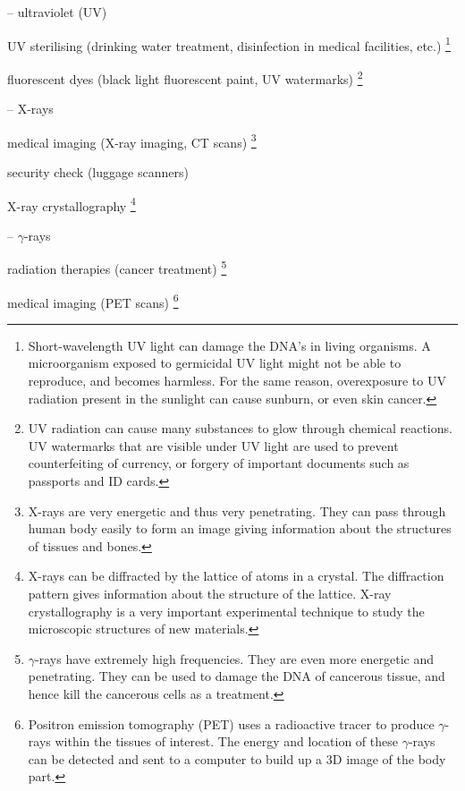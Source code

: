 \begin{compactitem}
	\item[--] ultraviolet (UV)
	
	\xskip UV sterilising (drinking water treatment, disinfection in medical facilities, etc.)
	\footnote{Short-wavelength UV light can damage the DNA's in living organisms. A microorganism exposed to germicidal UV light might not be able to reproduce, and becomes harmless. For the same reason, overexposure to UV radiation present in the sunlight can cause sunburn, or even skin cancer.}
		
	\xskip fluorescent dyes (black light fluorescent paint, UV watermarks)
	\footnote{UV radiation can cause many substances to glow through chemical reactions. UV watermarks that are visible under UV light are used to prevent counterfeiting of currency, or forgery of important documents such as passports and ID cards.}
	
	\item[--] X-rays
	
	\xskip medical imaging (X-ray imaging, CT scans)
	\footnote{X-rays are very energetic and thus very penetrating. They can pass through human body easily to form an image giving information about the structures of tissues and bones.}
	
	\xskip security check (luggage scanners)
	
	\xskip X-ray crystallography
	\footnote{X-rays can be diffracted by the lattice of atoms in a crystal. The diffraction pattern gives information about the structure of the lattice. X-ray crystallography is a very important experimental technique to study the microscopic structures of new materials.}
	
	\item[--] $\gamma$-rays
	
	\xskip radiation therapies (cancer treatment)
	\footnote{$\gamma$-rays have extremely high frequencies. They are even more energetic and penetrating. They can be used to damage the DNA of cancerous tissue, and hence kill the cancerous cells as a treatment.}
	
	\xskip medical imaging (PET scans)
	\footnote{Positron emission tomography (PET) uses a radioactive tracer to produce $\gamma$-rays within the tissues of interest. The energy and location of these $\gamma$-rays can be detected and sent to a computer to build up a 3D image of the body part.}
\end{compactitem}


